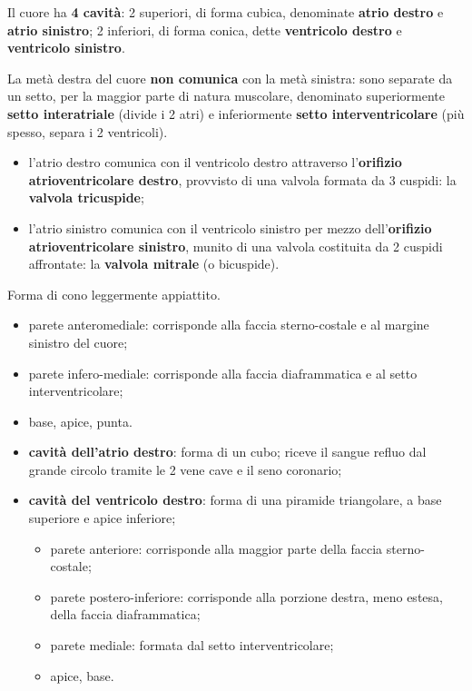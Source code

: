 Il cuore ha \textbf{4 cavità}: 2 superiori, di forma cubica, denominate \textbf{atrio destro} e
\textbf{atrio sinistro}; 2 inferiori, di forma conica, dette \textbf{ventricolo destro} e
\textbf{ventricolo sinistro}.

La metà destra del cuore \textbf{non comunica} con la metà sinistra: sono separate da un setto,
per la maggior parte di natura muscolare, denominato superiormente \textbf{setto interatriale}
(divide i 2 atri) e inferiormente \textbf{setto interventricolare} (più spesso, separa i 2
ventricoli).
\begin{itemize}
  \item l'atrio destro comunica con il ventricolo destro attraverso l'\textbf{orifizio
    atrioventricolare destro}, provvisto di una valvola formata da 3 cuspidi: la \textbf{valvola
    tricuspide};
  \item l'atrio sinistro comunica con il ventricolo sinistro per mezzo dell'\textbf{orifizio
    atrioventricolare sinistro}, munito di una valvola costituita da 2 cuspidi affrontate: la
    \textbf{valvola mitrale} (o bicuspide).
\end{itemize}

Forma di cono leggermente appiattito.
\begin{itemize}
  \item parete anteromediale: corrisponde alla faccia sterno-costale e al margine sinistro del
    cuore;
  \item parete infero-mediale: corrisponde alla faccia diaframmatica e al setto
    interventricolare;
  \item base, apice, punta.
\end{itemize}

\begin{itemize}
  \item \textbf{cavità dell'atrio destro}: forma di un cubo; riceve il sangue refluo dal grande
    circolo tramite le 2 vene cave e il seno coronario;
  \item \textbf{cavità del ventricolo destro}: forma di una piramide triangolare, a base
    superiore e apice inferiore;
  \begin{itemize}
    \item parete anteriore: corrisponde alla maggior parte della faccia sterno-costale;
    \item parete postero-inferiore: corrisponde alla porzione destra, meno estesa, della faccia
      diaframmatica;
    \item parete mediale: formata dal setto interventricolare;
    \item apice, base.
  \end{itemize}
\end{itemize}

